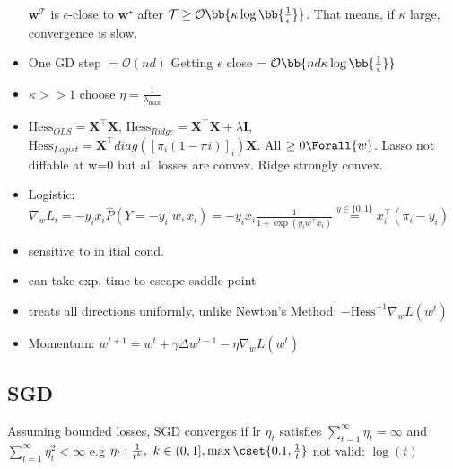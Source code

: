 \begin{itemize}
$\bm{w}^{\mathcal{T}}$ is $\epsilon$-close to $\bm{w}^{\star}$ after
$\mathcal{T} \geq \mathcal{O}\bb{\kappa\log\bb{\frac{1}{\epsilon}}}$.
That means, if $\kappa$ large, convergence is slow.
\item One GD step $= \mathcal{O}(nd)$ Getting $\epsilon$ close = $\mathcal{O}\bb{nd\kappa\log\bb{\frac{1}{\epsilon}}}$
\item
$\kappa >> 1$ choose $\eta = \frac{1}{\lambda_{\max}}$
\item $\text{Hess}_{OLS} = \bm{X}^{\top}\bm{X}$, $\text{Hess}_{Ridge} = \bm{X}^{\top}\bm{X} + \lambda\bm{I}$,
$\text{Hess}_{Logist} = \bm{X}^{\top}diag([\pi_{i}(1-\pi{i})]_{i})\bm{X}$. All $\geq 0 \Forall {w}$.
Lasso not diffable at w=0 but all losses are convex. Ridge strongly convex.
\item Logistic: $\nabla_{w}L_{i} = -y_{i}x_{i}\hat{P}(Y=-y_{i}| w, x_{i}) =
-y_{i}x_{i} \frac{1}{1+\exp(y_{i}w^{\top} x_{i})} \overset{y \in \{0,1\}}{=} x_{i}^{\top}(\pi_{i}-y_{i})$
\item sensitive to in itial cond.
\item can take exp. time to escape saddle point
\item treats all directions uniformly, unlike Newton's Method: $-\text{Hess}^{-1} \nabla_{w}L(w^{t})$
\item Momentum: $w^{t+1} = w^{t} + \gamma\Delta w^{t-1} - \eta \nabla_{w}L(w^{t})$
\end{itemize}

\subsection{SGD}
Assuming bounded losses, SGD converges if lr $\eta_{t}$ satisfies $\sum_{t=1}^{\infty}\eta_{t} = \infty$
    and $\sum_{t=1}^{\infty}\eta_{t}^{2} < \infty$
e.g $\eta_{t}:\frac{1}{t^{k}},\ k \in (0,1],\max\cset{0.1,\frac{1}{t}}$ not valid: $\log(t)$



